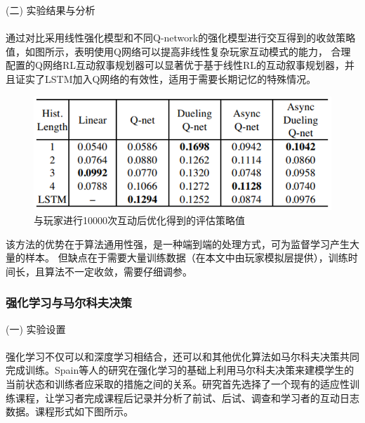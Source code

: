 \documentclass[12pt]{article}
\begin{document}
            (二) 实验结果与分析\paragraph{}
            通过对比采用线性强化模型和不同Q-network的强化模型进行交互得到的收敛策略值，如图所示，表明使用Q网络可以提高非线性复杂玩家互动模式的能力，
            合理配置的Q网络RL互动叙事规划器可以显著优于基于线性RL的互动叙事规划器，并且证实了LSTM加入Q网络的有效性，适用于需要长期记忆的特殊情况。
            \begin{figure}[H]
            	
            	\centering
            	\includegraphics[scale=0.7]{images/policy_value.png}
            	\caption{与玩家进行10000次互动后优化得到的评估策略值}
            	\label{fig:label}
            \end{figure}

            该方法的优势在于算法通用性强，是一种端到端的处理方式，可为监督学习产生大量的样本。
            但缺点在于需要大量训练数据（在本文中由玩家模拟层提供），训练时间长，且算法不一定收敛，需要仔细调参。

            \subsubsection{强化学习与马尔科夫决策}
            (一) 实验设置\paragraph{}
            强化学习不仅可以和深度学习相结合，还可以和其他优化算法如马尔科夫决策共同完成训练。Spain等人\cite{ref16}的研究在强化学习的基础上利用马尔科夫决策来建模学生的当前状态和训练者应采取的措施之间的关系。研究首先选择了一个现有的适应性训练课程，让学习者完成课程后记录并分析了前试、后试、调查和学习者的互动日志数据。课程形式如下图所示。
\end{document}

